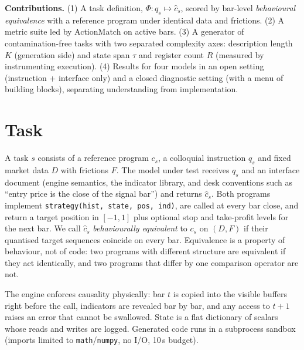 \documentclass[sigconf,anonymous,review]{acmart}
\begin{document}
\textbf{Contributions.} (1) A task definition, $\Phi: q_s \mapsto \hat c_s$, scored by bar-level
\emph{behavioural equivalence} with a reference program under identical data and frictions.
(2) A metric suite led by ActionMatch on active bars. (3) A generator of contamination-free tasks
with two separated complexity axes: description length $K$ (generation side) and state span
$\tau$ and register count $R$ (measured by instrumenting execution). (4) Results for four models in an open setting (instruction + interface only) and a closed
diagnostic setting (with a menu of building blocks), separating understanding from implementation.

\section{Task}
A task $s$ consists of a reference program $c_s$, a colloquial instruction $q_s$ and fixed
market data $D$ with frictions $F$. The model under test receives $q_s$ and an interface
document (engine semantics, the indicator library, and desk conventions such as ``entry
price is the close of the signal bar'') and returns $\hat c_s$. Both programs implement
\texttt{strategy(hist, state, pos, ind)}, are called at every bar close, and return a target
position in $[-1,1]$ plus optional stop and take-profit levels for the next bar. We call
$\hat c_s$ \emph{behaviourally equivalent} to $c_s$ on $(D,F)$ if their quantised target
sequences coincide on every bar. Equivalence is a property of behaviour, not of code: two
programs with different structure are equivalent if they act identically, and two programs
that differ by one comparison operator are not.

The engine enforces causality physically: bar $t$ is copied into the visible buffers right
before the call, indicators are revealed bar by bar, and any access to $t{+}1$ raises an error
that cannot be swallowed. State is a flat dictionary of scalars whose reads and writes are logged.
Generated code runs in a subprocess sandbox (imports limited to \texttt{math}/\texttt{numpy}, no
I/O, 10\,s budget).
\end{document}

